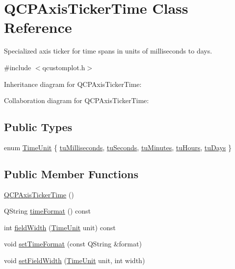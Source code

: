 \hypertarget{class_q_c_p_axis_ticker_time}{}\section{Q\+C\+P\+Axis\+Ticker\+Time Class Reference}
\label{class_q_c_p_axis_ticker_time}


Specialized axis ticker for time spans in units of milliseconds to days.  




{\ttfamily \#include $<$qcustomplot.\+h$>$}



Inheritance diagram for Q\+C\+P\+Axis\+Ticker\+Time\+:


Collaboration diagram for Q\+C\+P\+Axis\+Ticker\+Time\+:
\subsection*{Public Types}
\begin{DoxyCompactItemize}
\item 
enum \hyperlink{class_q_c_p_axis_ticker_time_a5c48ded8c6d3a1aca9b68219469fea3e}{Time\+Unit} \{ \newline
\hyperlink{class_q_c_p_axis_ticker_time_a5c48ded8c6d3a1aca9b68219469fea3ea809db637d2a7f601287c8790facc25cf}{tu\+Milliseconds}, 
\hyperlink{class_q_c_p_axis_ticker_time_a5c48ded8c6d3a1aca9b68219469fea3ea22b2c1842215272ae827eea2d1cc037d}{tu\+Seconds}, 
\hyperlink{class_q_c_p_axis_ticker_time_a5c48ded8c6d3a1aca9b68219469fea3ea682de6640daef46cffd8a080348d7d00}{tu\+Minutes}, 
\hyperlink{class_q_c_p_axis_ticker_time_a5c48ded8c6d3a1aca9b68219469fea3ea83a5713594424ba17f1f62f18f0e5935}{tu\+Hours}, 
\newline
\hyperlink{class_q_c_p_axis_ticker_time_a5c48ded8c6d3a1aca9b68219469fea3eaf9729e64545307a80a0e3527d6da6556}{tu\+Days}
 \}
\end{DoxyCompactItemize}
\subsection*{Public Member Functions}
\begin{DoxyCompactItemize}
\item 
\hyperlink{class_q_c_p_axis_ticker_time_a5145aac1d2117fdac411d9e8552cc41b}{Q\+C\+P\+Axis\+Ticker\+Time} ()
\item 
Q\+String \hyperlink{class_q_c_p_axis_ticker_time_a99ad61dc7434a7fed1850e96bf748834}{time\+Format} () const
\item 
int \hyperlink{class_q_c_p_axis_ticker_time_a6b58a98e4d64c6764aa61a707e4a344d}{field\+Width} (\hyperlink{class_q_c_p_axis_ticker_time_a5c48ded8c6d3a1aca9b68219469fea3e}{Time\+Unit} unit) const
\item 
void \hyperlink{class_q_c_p_axis_ticker_time_a2f30b6e5125bce4256be9ce3177088ea}{set\+Time\+Format} (const Q\+String \&format)
\item 
void \hyperlink{class_q_c_p_axis_ticker_time_adc13e54fc969be98a5c0e3fa0dbaa293}{set\+Field\+Width} (\hyperlink{class_q_c_p_axis_ticker_time_a5c48ded8c6d3a1aca9b68219469fea3e}{Time\+Unit} unit, int width)
\end{DoxyCompactItemize}
